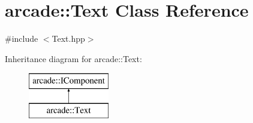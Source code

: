 \hypertarget{classarcade_1_1_text}{\section{arcade\-:\-:Text Class Reference}
\label{classarcade_1_1_text}
}


{\ttfamily \#include $<$Text.\-hpp$>$}

Inheritance diagram for arcade\-:\-:Text\-:\begin{figure}[H]
\begin{center}
\leavevmode
\includegraphics[height=2.000000cm]{classarcade_1_1_text}
\end{center}
\end{figure}
